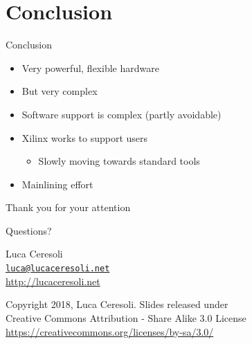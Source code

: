 \documentclass[xetex,table]{beamer}
\begin{document}
\section{Conclusion}

\begin{frame}{Conclusion}
  \begin{itemize}
  \item Very powerful, flexible hardware
  \item But very complex
  \item Software support is complex (partly avoidable)
  \item Xilinx works to support users
    \begin{itemize}
    \item Slowly moving towards standard tools
    \end{itemize}
  \item Mainlining effort
  \end{itemize}
\end{frame}

\begin{frame}
  \begin{center}
    Thank you for your attention

    \vspace{0.15\textheight}

    {\Huge Questions?}

    \vspace{0.15\textheight}

    {\Large Luca Ceresoli}\\
    \href{mailto:luca@lucaceresoli.net}{\tt luca@lucaceresoli.net}\\
    \url{http://lucaceresoli.net}

    \vspace{0.05\textheight}

    \tiny
    \textcopyright{} Copyright 2018, Luca Ceresoli.
    Slides released under\\
    Creative Commons Attribution - Share Alike 3.0 License \\
    \url{https://creativecommons.org/licenses/by-sa/3.0/} \\
  \end{center}
\end{frame}
\end{document}
